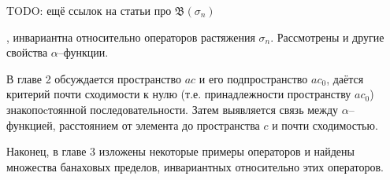 TODO: ещё ссылок на статьи про $\mathfrak{B}(\sigma_n)$

, инвариантна относительно операторов растяжения $\sigma_n$.
Рассмотрены и другие свойства $\alpha$--функции.

В главе 2 обсуждается пространство $ac$ и его подпространство $ac_0$,
даётся критерий почти сходимости к нулю (т.е. принадлежности пространству $ac_0$)
знакопоcтоянной последовательности.
Затем выявляется связь между $\alpha$--функцией, расстоянием от элемента до пространства $c$
и почти сходимостью.

Наконец, в главе 3 изложены некоторые примеры операторов и найдены множества банаховых пределов,
инвариантных относительно этих операторов.
